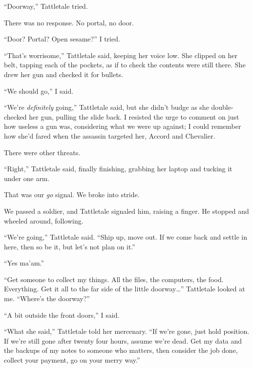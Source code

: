 ``Doorway,'' Tattletale tried.



There was no response.  No portal, no door.



``Door?  Portal?  Open sesame?''  I tried.



``That's worrisome,'' Tattletale said, keeping her voice low.  She clipped on her belt, tapping each of the pockets, as if to check the contents were still there.  She drew her gun and checked it for bullets.



``We should go,'' I said.



``We're \emph{definitely} going,'' Tattletale said, but she didn't budge as she double-checked her gun, pulling the slide back.  I resisted the urge to comment on just how useless a gun was, considering what we were up against; I could remember how she'd fared when the assassin targeted her, Accord and Chevalier.



There were other threats.



``Right,'' Tattletale said, finally finishing, grabbing her laptop and tucking it under one arm.



That was our \emph{go} signal.  We broke into stride.



We passed a soldier, and Tattletale signaled him, raising a finger.  He stopped and wheeled around, following.



``We're going,'' Tattletale said.  ``Ship up, move out.  If we come back and settle in here, then so be it, but let's not plan on it.''



``Yes ma'am.''



``Get someone to collect my things.  All the files, the computers, the food.  Everything.  Get it all to the far side of the little doorway\ldots''  Tattletale looked at me.  ``Where's the doorway?''



``A bit outside the front doors,'' I said.



``What she said,'' Tattletale told her mercenary.  ``If we're gone, just hold position.  If we're still gone after twenty four hours, assume we're dead.  Get my data and the backups of my notes to someone who matters, then consider the job done, collect your payment, go on your merry way.''



